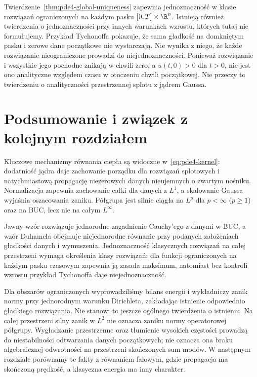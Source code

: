 \begin{uwaga}
Twierdzenie~\ref{thm:pde4-global-uniqueness}
zapewnia jednoznaczność w klasie rozwiązań
ograniczonych na każdym pasku $[0,T]\times\R^n$.
Istnieją również twierdzenia o jednoznaczności
przy innych warunkach wzrostu, których tutaj
nie formułujemy. Przykład Tychonoffa pokazuje,
że sama gładkość na domkniętym pasku i zerowe
dane początkowe nie wystarczają.
Nie wynika z niego, że każde rozwiązanie
nieograniczone prowadzi do niejednoznaczności.
Ponieważ rozwiązanie i wszystkie jego pochodne
znikają w chwili zero, a $u(t,0)>0$ dla $t>0$,
nie jest ono analityczne względem czasu
w otoczeniu chwili początkowej.
Nie przeczy to twierdzeniu o analityczności
przestrzennej splotu z jądrem Gaussa.
\end{uwaga}

\section{Podsumowanie i związek z kolejnym rozdziałem}
\label{sec:pde4-summary}

Kluczowe mechanizmy równania ciepła są widoczne
w~\eqref{eq:pde4-kernel}: dodatniość jądra daje
zachowanie porządku dla rozwiązań splotowych
i natychmiastową propagację niezerowych danych
nieujemnych o zwartym nośniku. Normalizacja
zapewnia zachowanie całki dla danych z $L^1$,
a skalowanie Gaussa wyjaśnia oszacowania zaniku.
Półgrupa jest silnie ciągła na $L^p$ dla $p<\infty$
($p\geq1$) oraz na $\mathrm{BUC}$, lecz nie na
całym $L^\infty$.

Jawny wzór rozwiązuje jednorodne zagadnienie
Cauchy'ego z danymi w $\mathrm{BUC}$, a wzór
Duhamela obejmuje niejednorodne równanie przy
podanych założeniach gładkości danych i wymuszenia.
Jednoznaczność klasycznych rozwiązań na całej
przestrzeni wymaga określenia klasy rozwiązań:
dla funkcji ograniczonych na każdym pasku
czasowym zapewnia ją zasada maksimum, natomiast bez
kontroli wzrostu przykład Tychonoffa daje
niejednoznaczność.

Dla obszarów ograniczonych wyprowadziliśmy bilans
energii i wykładniczy zanik normy przy jednorodnym
warunku Dirichleta, zakładając istnienie odpowiednio
gładkiego rozwiązania. Nie stanowi to jeszcze
ogólnego twierdzenia o istnieniu.
Na całej przestrzeni silny zanik w $L^2$ nie oznacza
zaniku normy operatorowej półgrupy. Wygładzanie
przestrzenne oraz tłumienie wysokich częstości
prowadzą do niestabilności odtwarzania danych
początkowych; nie oznacza ona braku algebraicznej
odwrotności na przestrzeni skończonych sum modów.
W następnym rozdziale porównamy te fakty z równaniem
falowym, gdzie propagacja ma skończoną prędkość,
a klasyczna energia ma inny charakter.


